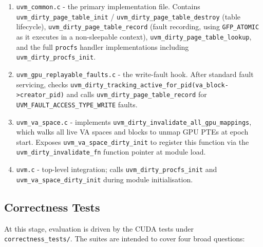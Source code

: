 \begin{enumerate}
    \item \texttt{uvm\_common.c} - the primary implementation file.
          Contains \texttt{uvm\_dirty\_page\_table\_init} /
          \texttt{uvm\_dirty\_page\_table\_destroy} (table lifecycle),
          \texttt{uvm\_dirty\_page\_table\_record} (fault recording, using
          \texttt{GFP\_ATOMIC} as it executes in a non-sleepable context),
          \texttt{uvm\_dirty\_page\_table\_lookup}, and the full
          \texttt{procfs} handler implementations including
          \texttt{uvm\_dirty\_procfs\_init}.
    \item {\raggedright
          \texttt{uvm\_gpu\_replayable\_faults.c} - the write-fault hook.
          After standard fault servicing, checks
          \texttt{uvm\_dirty\_tracking\_active\_for\_pid\allowbreak(va\_block->creator\_pid)}
          and calls \texttt{uvm\_dirty\_page\_table\_record} for
          \texttt{UVM\_FAULT\_ACCESS\_TYPE\_WRITE} faults.\par}
    \item \texttt{uvm\_va\_space.c} - implements
          \texttt{uvm\_dirty\_invalidate\_all\_gpu\_mappings}, which walks all
          live VA spaces and blocks to unmap GPU PTEs at epoch start. Exposes
          \texttt{uvm\_va\_space\_dirty\_init} to register this function via
          the \texttt{uvm\_dirty\_invalidate\_fn} function pointer at module
          load.
    \item \texttt{uvm.c} - top-level integration; calls
          \texttt{uvm\_dirty\_procfs\_init} and
          \texttt{uvm\_va\_space\_dirty\_init} during module initialisation.
\end{enumerate}

\subsection*{Correctness Tests}

At this stage, evaluation is driven by the CUDA tests under \texttt{correctness\_tests/}.
The suites are intended to cover four broad questions:

